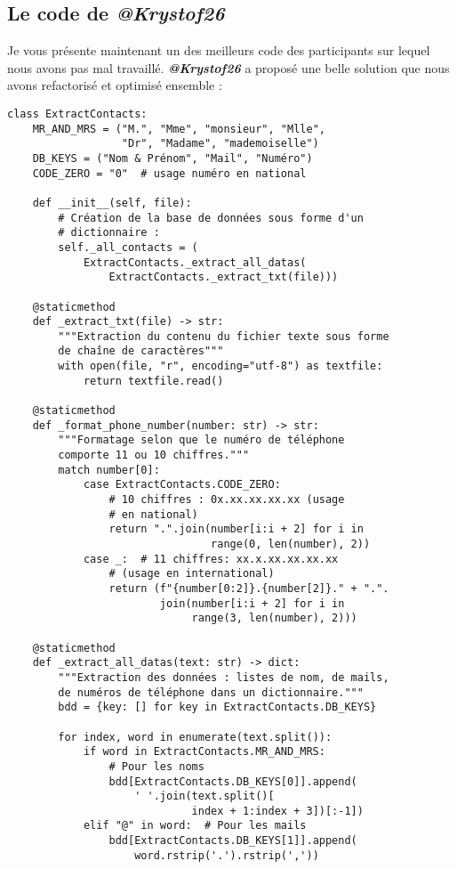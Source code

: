 \subsection*{Le code de \textit{@Krystof26}}
Je vous présente maintenant un des meilleurs code des participants sur lequel nous avons pas mal travaillé. \textbf{\textit{@Krystof26}} a proposé une belle solution que nous avons refactorisé et optimisé ensemble :
\begin{lstlisting}
class ExtractContacts:
    MR_AND_MRS = ("M.", "Mme", "monsieur", "Mlle",
                  "Dr", "Madame", "mademoiselle")
    DB_KEYS = ("Nom & Prénom", "Mail", "Numéro")
    CODE_ZERO = "0"  # usage numéro en national

    def __init__(self, file):
        # Création de la base de données sous forme d'un
        # dictionnaire :
        self._all_contacts = (
            ExtractContacts._extract_all_datas(
                ExtractContacts._extract_txt(file)))

    @staticmethod
    def _extract_txt(file) -> str:
        """Extraction du contenu du fichier texte sous forme
        de chaîne de caractères"""
        with open(file, "r", encoding="utf-8") as textfile:
            return textfile.read()

    @staticmethod
    def _format_phone_number(number: str) -> str:
        """Formatage selon que le numéro de téléphone
        comporte 11 ou 10 chiffres."""
        match number[0]:
            case ExtractContacts.CODE_ZERO:
                # 10 chiffres : 0x.xx.xx.xx.xx (usage
                # en national)
                return ".".join(number[i:i + 2] for i in
                                range(0, len(number), 2))
            case _:  # 11 chiffres: xx.x.xx.xx.xx.xx
                # (usage en international)
                return (f"{number[0:2]}.{number[2]}." + ".".
                        join(number[i:i + 2] for i in
                             range(3, len(number), 2)))

    @staticmethod
    def _extract_all_datas(text: str) -> dict:
        """Extraction des données : listes de nom, de mails,
        de numéros de téléphone dans un dictionnaire."""
        bdd = {key: [] for key in ExtractContacts.DB_KEYS}

        for index, word in enumerate(text.split()):
            if word in ExtractContacts.MR_AND_MRS:
                # Pour les noms
                bdd[ExtractContacts.DB_KEYS[0]].append(
                    ' '.join(text.split()[
                             index + 1:index + 3])[:-1])
            elif "@" in word:  # Pour les mails
                bdd[ExtractContacts.DB_KEYS[1]].append(
                    word.rstrip('.').rstrip(','))


\end{lstlisting}

